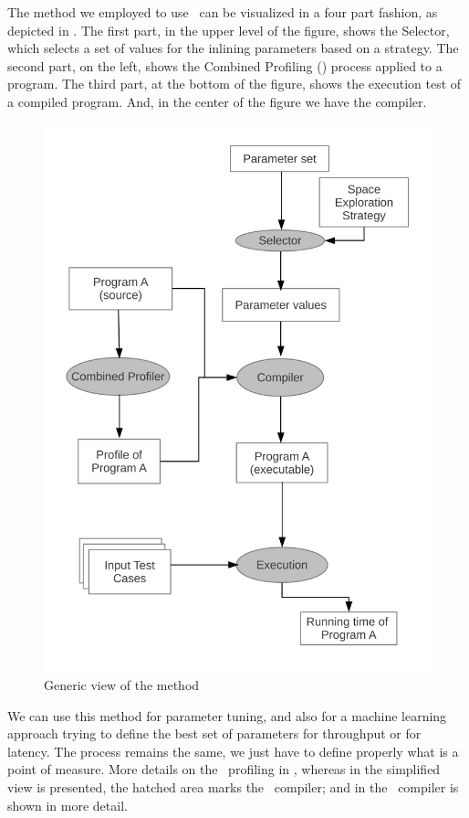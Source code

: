 
The method we employed to use \CP\ can be visualized in a four part
fashion, as depicted in . The first part, in
the upper level of the figure, shows the Selector, which selects a
set of values for the inlining parameters based on a strategy. The
second part, on the left, shows the Combined Profiling (\CP) process
applied to a program. The third part, at the bottom of the figure,
shows the execution test of a compiled program. And, in the center
of the figure we have the compiler.

\begin{figure}
  \centering
  \includegraphics[width=0.50\linewidth]{Figures/genView}
  \caption{Generic view of the method}
  \label{fig:genView}
\end{figure}

We can use this method for parameter tuning, and also for a machine
learning approach trying to define the best set of parameters for
throughput or for latency. The process remains the same, we just have
to define properly what is a point of measure. More details on the
\CP\ profiling in , whereas in 
the simplified view is presented, the hatched area marks the \CP\
compiler; and in  the \CP\ compiler is shown in
more detail.

